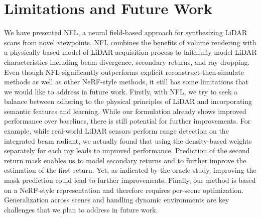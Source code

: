 \section{Limitations and Future Work}
\label{sec:conclusions}
We have presented NFL, a neural field-based approach for synthesizing LiDAR scans from novel viewpoints. NFL combines the benefits of volume rendering with a physically based model of LiDAR acquisition process to faithfully model LiDAR characteristics including beam divergence, secondary returns, and ray dropping. Even though NFL significantly outperforms explicit reconstruct-then-simulate methods as well as other NeRF-style methods, it still has some limitations that we would like to address in future work. Firstly, with NFL, we try to seek a balance between adhering to the physical principles of LiDAR and incorporating semantic features and learning. While our formulation already shows improved performance over baselines, there is still potential for further improvements. For example, while real-world LiDAR sensors perform range detection on the integrated beam radiant, we actually found that using the density-based weights separately for each ray leads to improved performance. Prediction of the second return mask enables us to model secondary returns and to further improve the estimation of the first return. Yet, as indicated by the oracle study, improving the mask prediction could lead to further improvements. Finally, our method is based on a NeRF-style representation and therefore requires per-scene optimization. Generalization across scenes and handling dynamic environments are key challenges that we plan to address in future work. 

